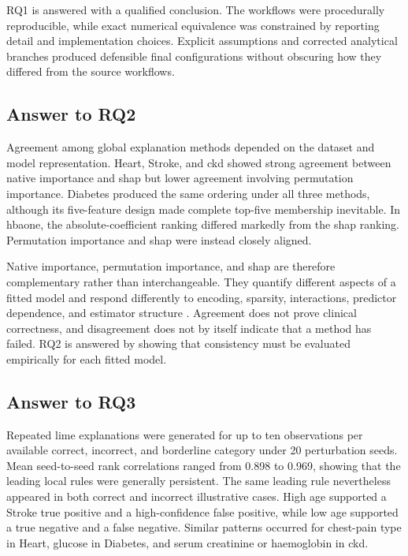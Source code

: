 RQ1 is answered with a qualified conclusion. The workflows were procedurally reproducible, while exact numerical equivalence was constrained by reporting detail and implementation choices. Explicit assumptions and corrected analytical branches produced defensible final configurations without obscuring how they differed from the source workflows.

\subsection{Answer to RQ2}

Agreement among global explanation methods depended on the dataset and model representation. Heart, Stroke, and \gls{ckd} showed strong agreement between native importance and \gls{shap} but lower agreement involving permutation importance. Diabetes produced the same ordering under all three methods, although its five-feature design made complete top-five membership inevitable. In \gls{hbaone}, the absolute-coefficient ranking differed markedly from the \gls{shap} ranking. Permutation importance and \gls{shap} were instead closely aligned.

Native importance, permutation importance, and \gls{shap} are therefore complementary rather than interchangeable. They quantify different aspects of a fitted model and respond differently to encoding, sparsity, interactions, predictor dependence, and estimator structure \citep{fisher_models_2019, NIPS2017_8a20a862, vilone_classification_2021}. Agreement does not prove clinical correctness, and disagreement does not by itself indicate that a method has failed. RQ2 is answered by showing that consistency must be evaluated empirically for each fitted model.

\subsection{Answer to RQ3}

Repeated \gls{lime} explanations were generated for up to ten observations per available correct, incorrect, and borderline category under 20 perturbation seeds. Mean seed-to-seed rank correlations ranged from 0.898 to 0.969, showing that the leading local rules were generally persistent. The same leading rule nevertheless appeared in both correct and incorrect illustrative cases. High age supported a Stroke true positive and a high-confidence false positive, while low age supported a true negative and a false negative. Similar patterns occurred for chest-pain type in Heart, glucose in Diabetes, and serum creatinine or haemoglobin in \gls{ckd}.

